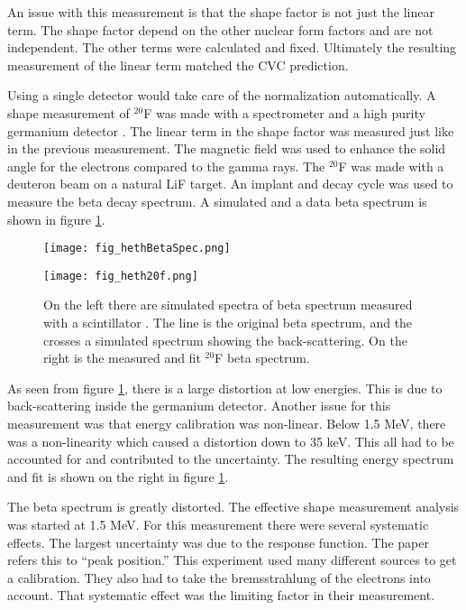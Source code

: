 \documentclass[../MaxHughesThesis.tex]{subfiles}
\begin{document}
An issue with this measurement is that the shape factor is not just the linear term.
The shape factor depend on the other nuclear form factors and are not independent.
The other terms were calculated and fixed.
Ultimately the resulting measurement of the linear term matched the CVC prediction.

Using a single detector would take care of the normalization automatically. 
A shape measurement of $^{20}$F was made with a spectrometer and a high purity germanium detector \cite{Het89}.
The linear term in the shape factor was measured just like in the previous measurement.
The magnetic field was used to enhance the solid angle for the electrons compared to the gamma rays.
The $^{20}$F was made with a deuteron beam on a natural LiF target. 
An implant and decay cycle was used to measure the beta decay spectrum. 
A simulated and a data beta spectrum is shown in figure \ref{fig:hethspec}.

\begin{figure}[!htb]
	\begin{minipage}[b][][b]{0.50\textwidth}
		\centerline{\texttt{[image: fig\_hethBetaSpec.png]}}
	\end{minipage}\hfill
	\begin{minipage}[b][][b]{0.50\textwidth}
		\centerline{\texttt{[image: fig\_heth20f.png]}}
	\end{minipage}
	\caption{On the left there are simulated spectra of beta spectrum measured with a scintillator \cite{Het89}.
		 The line is the original beta spectrum, and the crosses a simulated spectrum showing the back-scattering.
		 On the right is the measured and fit $^{20}$F beta spectrum.}
	\label{fig:hethspec}
\end{figure}

As seen from figure \ref{fig:hethspec}, there is a large distortion at low energies.
This is due to back-scattering inside the germanium detector.
Another issue for this measurement was that energy calibration was non-linear.
Below 1.5 MeV, there was a non-linearity which caused a distortion down to 35 keV. 
This all had to be accounted for and contributed to the uncertainty.
The resulting energy spectrum and fit is shown on the right in figure \ref{fig:hethspec}.


The beta spectrum is greatly distorted.
The effective shape measurement analysis was started at 1.5 MeV.
For this measurement there were several systematic effects.
The largest uncertainty was due to the response function.
The paper refers this to ``peak position.'' 
This experiment used many different sources to get a calibration.
They also had to take the bremsstrahlung of the electrons into account.
That systematic effect was the limiting factor in their measurement.
\end{document}
